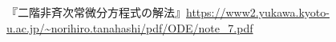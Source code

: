 \documentclass[10pt, a4paper]{ltjsarticle}
\begin{document}
\pagestyle{appendixPS}




\begin{thebibliography}{99}
  『二階非斉次常微分方程式の解法』\url{https://www2.yukawa.kyoto-u.ac.jp/~norihiro.tanahashi/pdf/ODE/note_7.pdf}
\end{thebibliography}
\end{document}
